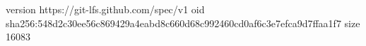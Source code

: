 version https://git-lfs.github.com/spec/v1
oid sha256:548d2c30ee56c869429a4eabd8c660d68c992460cd0af6c3e7efca9d7ffaa1f7
size 16083
